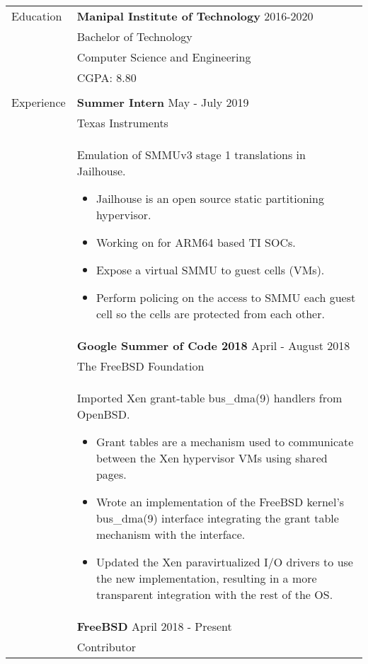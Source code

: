 \documentclass[letterpaper,11pt,oneside]{article}
\begin{document}
\noindent \begin{tabularx}{\textwidth}{l X}
 \Large{Education} & \textbf{Manipal Institute of Technology} \hfill 2016-2020  \\
     & Bachelor of Technology \\
     & Computer Science and Engineering \\
     &  CGPA: 8.80\\
     & \\
 \Large{Experience} & \textbf{Summer Intern} \hfill May - July 2019 \\
    & Texas Instruments \\
    & Emulation of SMMUv3 stage 1 translations in Jailhouse. \vspace{-1ex}
    \begin{itemize}[label={--}]
    \setlength\itemsep{-0.25em}
        \item Jailhouse is an open source static partitioning hypervisor.
        \item Working on for ARM64 based TI SOCs.
        \item Expose a virtual SMMU to guest cells (VMs).
        \item  Perform policing on the access to SMMU each guest cell so the cells are protected from each other.
    \end{itemize} \\
    & \textbf{Google Summer of Code 2018} \hfill April - August 2018 \\
    & The FreeBSD Foundation \\
    & Imported Xen grant-table bus\_dma(9) handlers from OpenBSD. \vspace{-1ex}
    \begin{itemize}[label={--}]
    \setlength\itemsep{-0.25em}
        \item Grant tables are a mechanism used to communicate between the Xen hypervisor VMs using shared pages.
        \item Wrote an implementation of the FreeBSD kernel's bus\_dma(9) interface integrating the grant table mechanism with the interface.
        \item Updated the Xen paravirtualized I/O drivers to use the new implementation, resulting in a more transparent integration with the rest of the OS.
    \end{itemize} \\
    & \textbf{FreeBSD} \hfill April 2018 - Present \\
    & Contributor \vspace{-1ex}

\end{tabularx}
\end{document}
